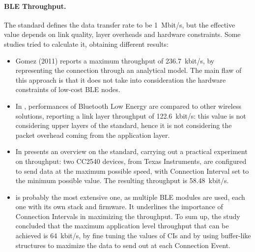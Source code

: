 \paragraph{BLE Throughput.}  The standard defines the data transfer rate to be 1~Mbit/s, but the effective value depends on link quality, layer overheads and hardware constraints. Some studies tried to calculate it, obtaining different results:
\begin{itemize}
    \item Gomez (2011) \cite{gomez2011modeling} reports a maximum throughput of 236.7~kbit/s, by representing the connection through an analytical model. The main flaw of this approach is that it does not take into consideration the hardware constraints of low-cost BLE nodes. 
    \item In \cite{mikhaylov2013performance}, performances of Bluetooth Low Energy are compared to other wireless solutions, reporting a link layer throughput of 122.6~kbit/s: this value is not considering upper layers of the standard, hence it is not considering the packet overhead coming from the application layer.
    \item In \cite{gomez2012overview} presents an overview on the standard, carrying out a practical experiment on throughput: two CC2540 devices, from Texas Instruments, are configured to send data at the maximum possible speed, with Connection Interval set to the minimum possible value. The resulting throughput is 58.48~kbit/s.
    \item \cite{giovanelli2015bluetooth} is probably the most extensive one, as multiple BLE modules are used, each one with its own stack and firmware. It underlines the importance of Connection Intervals in maximizing the throughput. To sum up, the study concluded that the maximum application level throughput that can be achieved is 64~kbit/s, by fine tuning the values of CIs and by using buffer-like structures to maximize the data to send out at each Connection Event.  
\end{itemize}
